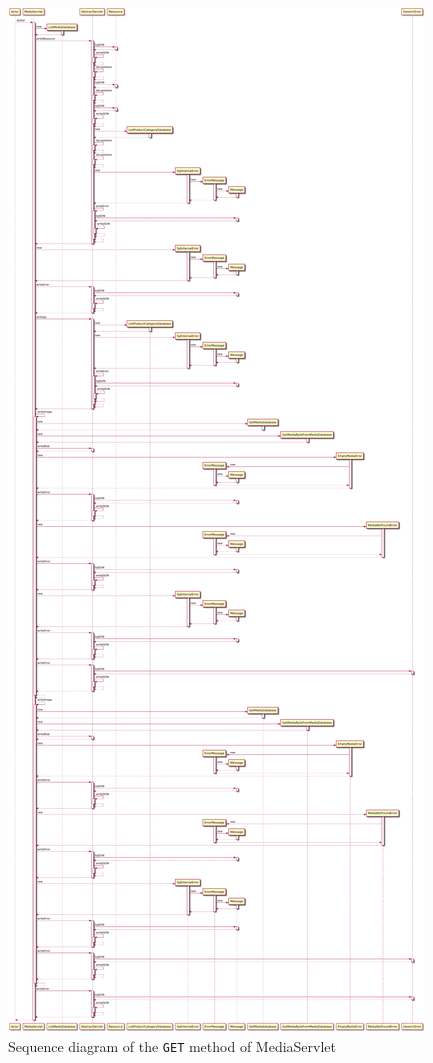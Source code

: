 \begin{figure}[H]
    \centering
    \includegraphics[width=\textwidth,height=0.95\textheight,keepaspectratio]{Schemas/MediaServlet_doGet.svg.pdf}
    \caption{Sequence diagram of the \texttt{GET} method of MediaServlet}
    \label{fig:MediaServlet_doGet}
\end{figure}
